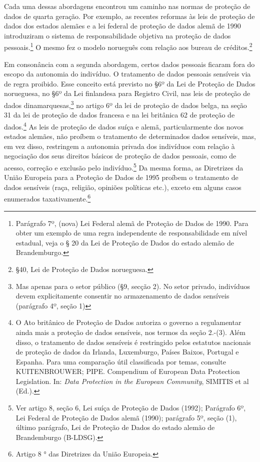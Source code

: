 Cada uma dessas abordagens encontrou um caminho nas normas de proteção
de dados de quarta geração. Por exemplo, as recentes reformas às leis de
proteção de dados dos estados alemães e a lei federal de proteção de
dados alemã de 1990 introduziram o sistema de responsabilidade objetiva
na proteção de dados pessoais.\footnote{Parágrafo 7º, (nova) Lei Federal
  alemã de Proteção de Dados de 1990. Para obter um exemplo de uma regra
  independente de responsabilidade em nível estadual, veja o § 20 da Lei
  de Proteção de Dados do estado alemão de Brandemburgo.} O mesmo fez o
modelo norueguês com relação aos bureau de créditos.\footnote{§40, Lei
  de Proteção de Dados norueguesa.}

Em consonância com a segunda abordagem, certos dados pessoais ficaram
fora do escopo da autonomia do indivíduo. O tratamento de dados pessoais
sensíveis via de regra proibido. Esse conceito está previsto no §6º da
Lei de Proteção de Dados norueguesa, no §6º da Lei finlandesa para
Registro Civil, nas leis de proteção de dados dinamarquesas,\footnote{Mas
  apenas para o setor público (§9, secção 2). No setor privado,
  indivíduos devem explicitamente consentir no armazenamento de dados
  sensíveis (parágrafo 4º, seção 1)} no artigo 6º da lei de proteção de
dados belga, na seção 31 da lei de proteção de dados francesa e na lei
britânica 62 de proteção de dados.\footnote{O Ato britânico de Proteção
  de Dados autoriza o governo a regulamentar ainda mais a proteção de
  dados sensíveis, nos termos da seção 2.-(3). Além disso, o tratamento
  de dados sensíveis é restringido pelos estatutos nacionais de proteção
  de dados da Irlanda, Luxemburgo, Países Baixos, Portugal e Espanha.
  Para uma comparação útil classificada por temas, consulte
  KUITENBROUWER; PIPE. Compendium of European Data Protection
  Legislation. In: \emph{Data Protection in the European Community},
  SIMITIS et al (Ed.).} As leis de proteção de dados suíça e alemã,
particularmente dos novos estados alemães, não proíbem o tratamento de
determinados dados sensíveis, mas, em vez disso, restringem a autonomia
privada dos indivíduos com relação à negociação dos seus direitos
básicos de proteção de dados pessoais, como de acesso, correção e
exclusão pelo indivíduo.\footnote{Ver artigo 8, seção 6, Lei suíça de
  Proteção de Dados (1992); Parágrafo 6º, Lei Federal de Proteção de
  Dados alemã (1990); parágrafo 5º, seção (1), último parágrafo, Lei de
  Proteção de Dados do estado alemão de Brandemburgo (B-LDSG).} Da mesma
forma, as Diretrizes da União Europeia para a Proteção de Dados de 1995
proíbem o tratamento de dados sensíveis (raça, religião, opiniões
políticas etc.), exceto em alguns casos enumerados
taxativamente.\footnote{Artigo 8 ° das Diretrizes da União Europeia.}


